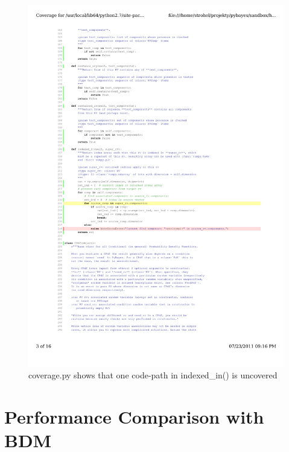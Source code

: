 \begin{figure}[h]
	\centering
	\includegraphics[width=\textwidth,keepaspectratio=true,clip=true,trim=24mm 109mm 60mm 117mm]{./coverage.pdf}
	\vspace{-8mm}
	\caption{coverage.py shows that one code-path in indexed\_in() is uncovered}
	\label{fig:Coverage}
\end{figure}

\section{Performance Comparison with BDM} \label{sec:PyBayesPerformance}

